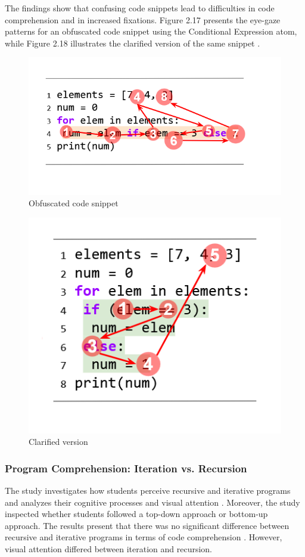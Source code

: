 The findings show that confusing code snippets lead to difficulties in code comprehension and in increased fixations. Figure 2.17 presents the eye-gaze patterns for an obfuscated code snippet using the Conditional Expression atom, while Figure 2.18 illustrates the clarified version of the same snippet \citet{silva2023evaluating}.
 

\begin{figure} [H]
  \centering
  \includegraphics[scale=1]{figures/a.png}
  \caption{Obfuscated code snippet \citet{silva2023evaluating}}
  \label{fig:AnhangsChor}
\end{figure}

\begin{figure} [H]
  \centering
  \includegraphics[scale=1]{figures/b.png}
  \caption{Clarified version \citet{silva2023evaluating}}
  \label{fig:AnhangsChor}
\end{figure}


\subsubsection{Program Comprehension: Iteration vs. Recursion} 
The study \citet{aroobaunderstanding} investigates how students perceive recursive and iterative programs and analyzes their cognitive processes and visual attention \citet{aroobaunderstanding}. Moreover, the study inspected whether students followed a top-down approach or bottom-up approach.
The results present that there was no significant difference between recursive and iterative programs in terms of code comprehension \citet{aroobaunderstanding}.  However, visual attention differed between iteration and recursion. 


